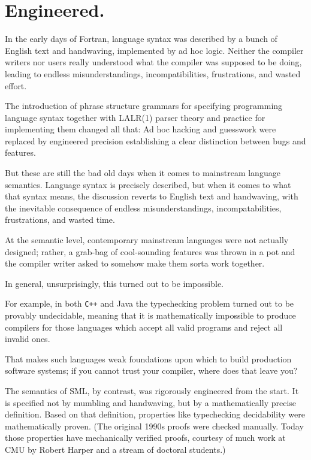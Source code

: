 
\section{Engineered.}

In the early days of Fortran, language syntax was described by a bunch of English 
text and handwaving, implemented by ad hoc logic. 
Neither the compiler writers nor users really understood what the compiler 
was supposed to be doing, leading to endless misunderstandings, incompatibilities, 
frustrations, and wasted effort.

The introduction of phrase structure grammars for specifying programming language 
syntax together with {\sc LALR(1)} parser theory and practice for implementing them 
changed all that:  Ad hoc hacking and guesswork were replaced by engineered 
precision establishing a clear distinction between bugs and features.

But these are still the bad old days when it comes to mainstream language semantics. 
Language syntax is precisely described, but when it comes to what that syntax means, 
the discussion reverts to English text and handwaving, with the inevitable consequence 
of endless misunderstandings, incompatabilities, frustrations, and wasted time. 

At the semantic level, contemporary mainstream languages were not actually designed;  rather, 
a grab-bag of cool-sounding features was thrown in a pot and the compiler 
writer asked to somehow make them sorta work together.

In general, unsurprisingly, this turned out to be impossible.

For example, in both \verb|C++| and Java the typechecking problem turned out 
to be provably undecidable, meaning that it is mathematically impossible 
to produce compilers for those languages which accept all valid programs and 
reject all invalid ones.

That makes such languages weak foundations upon which to build production 
software systems;  if you cannot trust your compiler, where does that leave you? 

The semantics of {\sc SML}, by contrast, was rigorously engineered from the 
start.  It is specified not by mumbling and handwaving, but by a mathematically 
precise definition.  Based on that definition, properties like typechecking 
decidability were mathematically proven.  (The original 1990s proofs were 
checked manually.  Today those properties have mechanically verified proofs, 
courtesy of much work at CMU by Robert Harper and a stream of doctoral students.)

